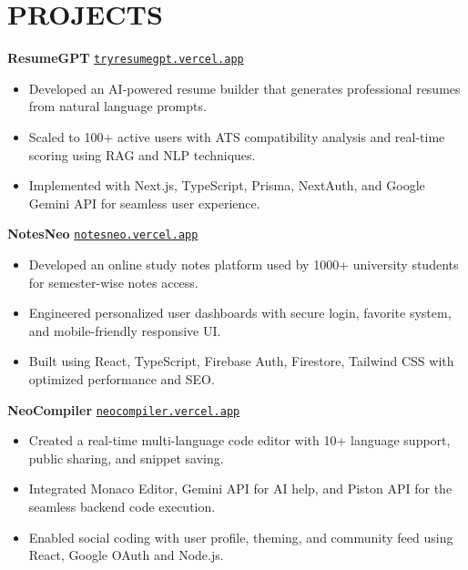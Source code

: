 \documentclass[a4paper,11pt]{article}
\begin{document}
\section*{PROJECTS}

\textbf{ResumeGPT} \hfill \href{https://tryresumegpt.vercel.app}{\texttt{tryresumegpt.vercel.app}}
\begin{itemize}
    \item Developed an AI-powered resume builder that generates professional resumes from natural language prompts.
    \item Scaled to 100+ active users with ATS compatibility analysis and real-time scoring using RAG and NLP techniques.
    \item Implemented with Next.js, TypeScript, Prisma, NextAuth, and Google Gemini API for seamless user experience.
\end{itemize}

\vspace{6pt}

\textbf{NotesNeo} \hfill \href{https://notesneo.vercel.app}{\texttt{notesneo.vercel.app}}
\begin{itemize}
    \item Developed an online study notes platform used by 1000+ university students for semester-wise notes access.
    \item Engineered personalized user dashboards with secure login, favorite system, and mobile-friendly responsive UI.
    \item Built using React, TypeScript, Firebase Auth, Firestore, Tailwind CSS with optimized performance and SEO.
\end{itemize}

\vspace{6pt}

\textbf{NeoCompiler} \hfill \href{https://neocompiler.vercel.app}{\texttt{neocompiler.vercel.app}}
\begin{itemize}
    \item Created a real-time multi-language code editor with 10+ language support, public sharing, and snippet saving.
    \item Integrated Monaco Editor, Gemini API for AI help, and Piston API for the seamless backend code execution.
    \item Enabled social coding with user profile, theming, and community feed using React, Google OAuth and Node.js.
\end{itemize}

\vspace{6pt}
\end{document}

